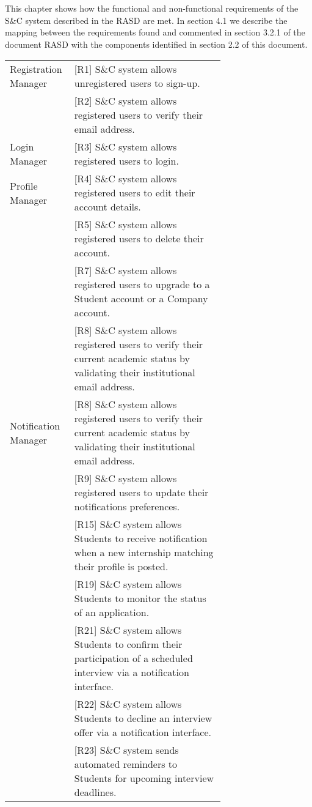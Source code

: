 This chapter shows how the functional and non-functional requirements of the S\&C system described in the RASD are met. In section 4.1 we describe the mapping between the requirements found and commented in section 3.2.1 of the document RASD with the components identified in section 2.2 of this document. 

\begin{center} 
    \renewcommand{\arraystretch}{1.2} 
    \begin{longtable}{| l |p{0.7\linewidth} |} 
        \hline 
        Registration Manager 
        & [R1] S\&C system allows unregistered users to sign-up. \\ 
        & [R2] S\&C system allows registered users to verify their email address. \\ \hline 
        Login Manager 
        & [R3] S\&C system allows registered users to login.\\ \hline
        Profile Manager 
        & [R4] S\&C system allows registered users to edit their account details. \\ 
        & [R5] S\&C system allows registered users to delete their account.\\
        & [R7] S\&C system allows registered users to upgrade to a Student account or a
        Company account. \\
        & [R8] S\&C system allows registered users to verify their current academic status by validating their institutional email address.\\ \hline 
        Notification Manager 
        &[R8] S\&C system allows registered users to verify their current academic status by validating their institutional email address.\\
        & [R9] S\&C system allows registered users to update their notifications preferences.\\
        & [R15] S\&C system allows Students to receive notification when a new internship matching their profile is posted.\\
        & [R19] S\&C system allows Students to monitor the status of an application.\\
        & [R21] S\&C system allows Students to confirm their participation of a scheduled interview via a notification interface.\\
        & [R22] S\&C system allows Students to decline an interview offer via a notification interface.\\
        & [R23] S\&C system sends automated reminders to Students for upcoming interview deadlines.\\

\end{longtable}
\end{center}
